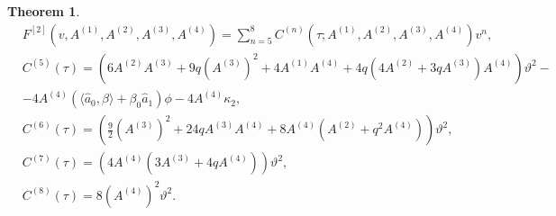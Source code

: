 \documentclass[pdftex,11pt,a4paper] {article}
\newtheorem{theorem}{Theorem}[section]
\begin{document}
\begin{theorem}
\begin{equation}\label{eq:OrigMGFLogAndQVOrd2Rem2Coeffs}
\begin{split}
& F^{[2]}(v,A^{(1)},A^{(2)}, A^{(3)}, A^{(4)})=\sum^{8}_{n=5}C^{(n)}(\tau; A^{(1)}, A^{(2)}, A^{(3)}, A^{(4)}) v^n,\\
& C^{(5)}(\tau)  = \left(6A^{(2)}A^{(3)} + 9 q(A^{(3)})^2 + 4A^{(1)}A^{(4)} + 4q(4A^{(2)} + 3qA^{(3)})A^{(4)}\right)\vartheta^2 - \\
&-4A^{(4)}(\langle \hat a_0, \beta\rangle+\beta_0 \hat a_1)\phi - 4 A^{(4)} \kappa_2,\\
& C^{(6)}(\tau)  = \left(\frac{9}{2}(A^{(3)})^2 + 24qA^{(3)}A^{(4)} + 8A^{(4)} (A^{(2)} + q^2 A^{(4)})\right)\vartheta^2, \\
& C^{(7)}(\tau)  = \left(4 A^{(4)} (3 A^{(3)} + 4 q A^{(4)}) \right)\vartheta^2,\\
& C^{(8)}(\tau)  = 8(A^{(4)})^2\vartheta^2.
\end{split}
\end{equation}
\end{theorem}
\end{document}
